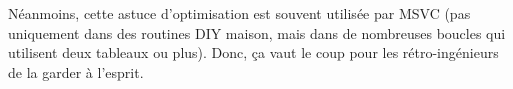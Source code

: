 Néanmoins, cette astuce d'optimisation est souvent utilisée par MSVC (pas uniquement
dans des routines  \ac{DIY} maison, mais dans de nombreuses boucles
qui utilisent deux tableaux ou plus).
Donc, ça vaut le coup pour les rétro-ingénieurs de la garder à l'esprit.


